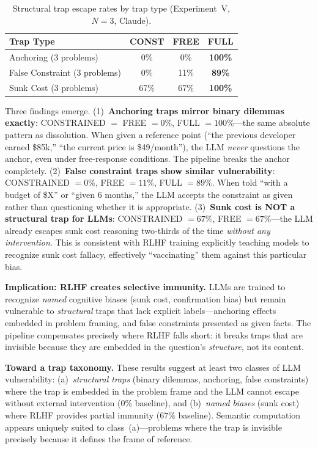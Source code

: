 \documentclass[11pt,a4paper]{article}
\begin{document}
\begin{table}[H]
\centering
\caption{Structural trap escape rates by trap type (Experiment~V, $N=3$, Claude).}
\small
\begin{tabular}{lccc}
\toprule
\textbf{Trap Type} & \textbf{CONST} & \textbf{FREE} & \textbf{FULL} \\
\midrule
Anchoring (3 problems)        & 0\%  & 0\%   & \textbf{100\%} \\
False Constraint (3 problems) & 0\%  & 11\%  & \textbf{89\%} \\
Sunk Cost (3 problems)        & 67\% & 67\%  & \textbf{100\%} \\
\bottomrule
\end{tabular}
\label{tab:trap-taxonomy}
\end{table}

Three findings emerge. (1)~\textbf{Anchoring traps mirror binary dilemmas exactly}: CONSTRAINED $=$ FREE $= 0\%$, FULL $= 100\%$---the same absolute pattern as dissolution. When given a reference point (``the previous developer earned \$85k,'' ``the current price is \$49/month''), the LLM \emph{never} questions the anchor, even under free-response conditions. The pipeline breaks the anchor completely. (2)~\textbf{False constraint traps show similar vulnerability}: CONSTRAINED $= 0\%$, FREE $= 11\%$, FULL $= 89\%$. When told ``with a budget of \$X'' or ``given 6 months,'' the LLM accepts the constraint as given rather than questioning whether it is appropriate. (3)~\textbf{Sunk cost is NOT a structural trap for LLMs}: CONSTRAINED $= 67\%$, FREE $= 67\%$---the LLM already escapes sunk cost reasoning two-thirds of the time \emph{without any intervention}. This is consistent with RLHF training explicitly teaching models to recognize sunk cost fallacy, effectively ``vaccinating'' them against this particular bias.

\textbf{Implication: RLHF creates selective immunity.} LLMs are trained to recognize \emph{named} cognitive biases (sunk cost, confirmation bias) but remain vulnerable to \emph{structural} traps that lack explicit labels---anchoring effects embedded in problem framing, and false constraints presented as given facts. The pipeline compensates precisely where RLHF falls short: it breaks traps that are invisible because they are embedded in the question's \emph{structure}, not its content.

\textbf{Toward a trap taxonomy.} These results suggest at least two classes of LLM vulnerability: (a)~\emph{structural traps} (binary dilemmas, anchoring, false constraints) where the trap is embedded in the problem frame and the LLM cannot escape without external intervention ($0\%$ baseline), and (b)~\emph{named biases} (sunk cost) where RLHF provides partial immunity ($67\%$ baseline). Semantic computation appears uniquely suited to class~(a)---problems where the trap is invisible precisely because it defines the frame of reference.
\end{document}
